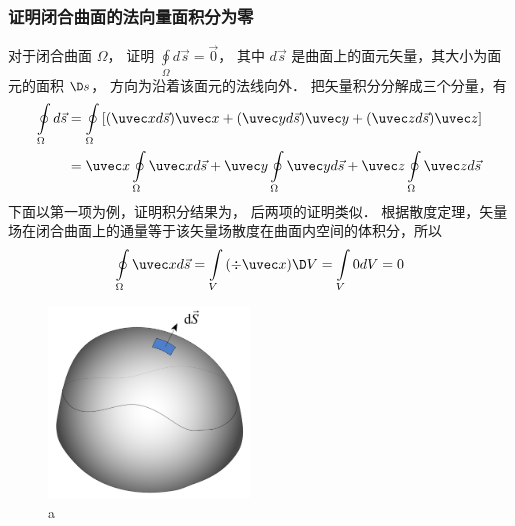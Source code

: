 
\subsubsection{证明闭合曲面的法向量面积分为零}
对于闭合曲面 $\Omega $，  证明 $\oint\limits_\Omega  {d\vec s = \vec 0} $， 其中 $d\vec s$ 是曲面上的面元矢量，其大小为面元的面积 $\D s$，  方向为沿着该面元的法线向外．
把矢量积分分解成三个分量，有
 \begin{equation}
\begin{aligned}
\oint\limits_\Omega  {d\vec s} & = \oint\limits_\Omega  {[(\uvec xd\vec s)\uvec x + (\uvec yd\vec s)\uvec y + (\uvec zd\vec s)\uvec z]} \\
 &= \uvec x\oint\limits_\Omega  {\uvec xd\vec s}  + \uvec y\oint\limits_\Omega  {\uvec y} d\vec s + \uvec z\oint\limits_\Omega  {\uvec zd\vec s} 
\end{aligned}
\end{equation}
下面以第一项为例，证明积分结果为， 后两项的证明类似．
根据散度定理，矢量场在闭合曲面上的通量等于该矢量场散度在曲面内空间的体积分，所以
  \begin{equation}
\oint\limits_\Omega  {\uvec xd\vec s}  = \int\limits_V {(\div \uvec x)\D V}  = \int\limits_V {0dV}  = 0
\end{equation}
\begin{figure}[ht]
\centering
\includegraphics[width=5.34cm]{./figures/CSI0.pdf}
\caption{a} \label{CSI0_fig1}
\end{figure}

 
 

